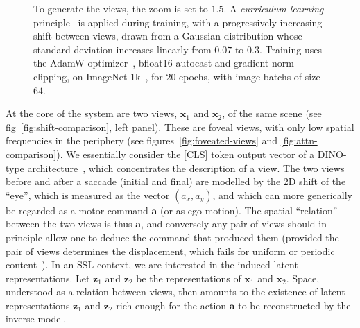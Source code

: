 \documentclass{article}
\begin{document}
\begin{figure}[t]
{  To generate the views, the zoom is set to $1.5$.
  A \emph{curriculum learning} principle~\cite{bengio2009curriculum} is applied during training, with a progressively increasing shift between views, drawn from a Gaussian distribution whose standard deviation increases linearly from $0.07$ to $0.3$.
  Training uses the AdamW optimizer~\cite{loshchilov2019decoupled}, bfloat16 autocast and gradient norm clipping, on ImageNet-1k~\cite{russakovsky2015imagenet}, for $20$ epochs, with image batchs of size $64$.}
  \label{fig:model-training}
\end{figure}

At the core of the system are two views, $\boldsymbol{x}_1$ and $\boldsymbol{x}_2$, of the same scene (see fig~\ref{fig:shift-comparison}, left panel). These are foveal views, with only low spatial frequencies in the periphery (see figures~\ref{fig:foveated-views} and \ref{fig:attn-comparison}). We essentially consider the [CLS] token output vector of a DINO-type architecture~\cite{caron2021emerging}, which concentrates the description of a view. The two views before and after a saccade (initial and final) are modelled by the 2D shift of the ``eye'', which is measured as the vector $(a_x,a_y)$, and which can more generically be regarded as a motor command $\boldsymbol{a}$ (or as ego-motion). The spatial ``relation'' between the two views is thus $\boldsymbol{a}$, and conversely any pair of views should in principle allow one to deduce the command that produced them (provided the pair of views determines the displacement, which fails for uniform or periodic content~\cite{wolpert1998multiple,agrawal2015learning}). In an SSL context, we are interested in the induced latent representations. Let $\boldsymbol{z}_1$ and $\boldsymbol{z}_2$ be the representations of $\boldsymbol{x}_1$ and $\boldsymbol{x}_2$. 
Space, understood as a relation between views, then amounts to the existence of latent representations $\boldsymbol{z}_1$ and $\boldsymbol{z}_2$ rich enough for the action $\boldsymbol{a}$ to be reconstructed by the inverse model.
\end{document}
